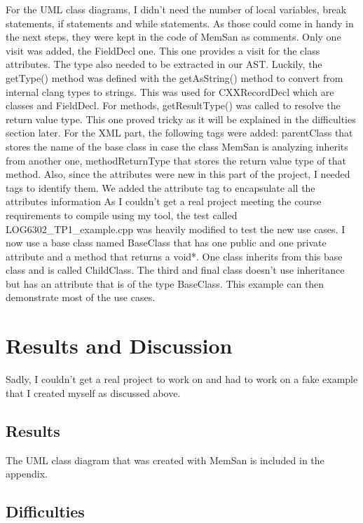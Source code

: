 \documentclass[conference,compsoc]{IEEEtran}
\begin{document}
 For the UML class diagrams, I didn't need
 the number of local variables, break statements, if statements
 and while statements. As those could come in handy in the next steps,
 they were kept in the code of MemSan as comments. Only one
 visit was added, the FieldDecl one. This one provides a visit
 for the class attributes. The type also needed to be extracted
 in our AST. Luckily, the getType() method was defined with the
 getAsString() method to convert from internal clang types to strings.
 This was used for CXXRecordDecl which are classes and FieldDecl.
 For methods, getResultType() was called to resolve the return value type.
 This one proved tricky as it will be explained in the difficulties section later.
 For the XML part, the following tags were added: parentClass that stores the
 name of the base class in case the class MemSan is analyzing inherits from another one,
 methodReturnType that stores the return value type of that method. Also, since the
 attributes were new in this part of the project, I needed tags to identify them.
 We added the attribute tag to encapsulate all the attributes information
 As I couldn't get a real project meeting the course requirements to compile using my
 tool, the test called LOG6302\_TP1\_example.cpp was heavily modified to test the new use
 cases. I now use a base class named BaseClass that has one public and one private
 attribute and a method that returns a void*. One class inherits from this base class
 and is called ChildClass. The third and final class doesn't use inheritance but
 has an attribute that is of the type BaseClass. This example can then demonstrate
 most of the use cases.


\section{Results and Discussion}

Sadly, I couldn't get a real project to work on and had to work on a fake example
 that I created myself as discussed above.

\subsection{Results}

The UML class diagram that was created with MemSan is included in the appendix.


\subsection{Difficulties}
\end{document}
